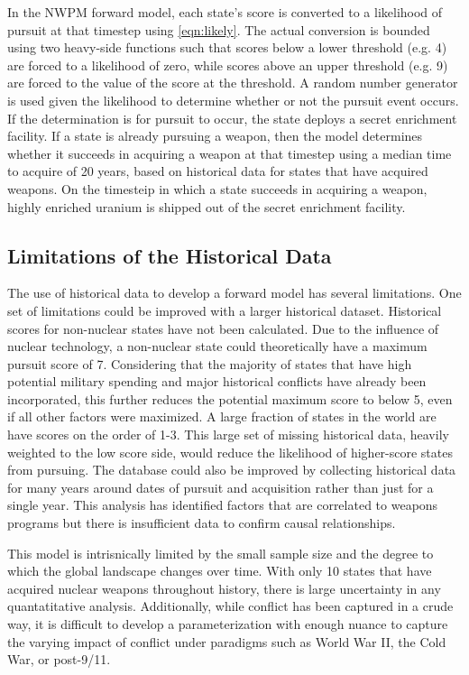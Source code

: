 In the \gls{NWPM} forward model, each state's score is converted to a likelihood of pursuit at that timestep using \ref{eqn:likely}. The actual conversion is bounded using two heavy-side functions such that scores below a lower threshold (e.g. 4) are forced to a likelihood of zero, while scores above an upper threshold (e.g. 9) are forced to the value of the score at the threshold.   A random number generator is used given the likelihood to determine whether or not the pursuit event occurs. If the determination is for pursuit to occur, the state deploys a secret enrichment facility. If a state is already pursuing a weapon, then the model determines whether it succeeds in acquiring a weapon at that timestep using a median time to acquire of 20 years, based on historical data for states that have acquired weapons. On the timesteip in which a state succeeds in acquiring a weapon, highly enriched uranium is shipped out of the secret enrichment facility.

\subsection{Limitations of the Historical Data}
The use of historical data to develop a forward model has several limitations. One set of limitations could be improved with a larger historical dataset.  Historical scores for non-nuclear states have not been calculated. Due to the influence of nuclear technology, a non-nuclear state could theoretically have a maximum pursuit score of 7. Considering that the majority of states that have high potential military spending and major historical conflicts have already been incorporated, this further reduces the potential maximum score to below 5, even if all other factors were maximized.  A large fraction of states in the world are have scores on the order of 1-3.  This large set of missing historical data, heavily weighted to the low score side, would reduce the likelihood of higher-score states from pursuing.  The database could also be improved by collecting historical data for many years around dates of pursuit and acquisition rather than just for a single year. This analysis has identified factors that are correlated to weapons programs but there is insufficient data to confirm causal relationships.   

This model is intrisnically limited by the small sample size and the degree to which the global landscape changes over time. With only 10 states that have acquired nuclear weapons throughout history, there is large uncertainty in any quantatitative analysis. Additionally, while conflict has been captured in a crude way, it is difficult to develop a parameterization with enough nuance to capture the varying impact of conflict under paradigms such as World War II, the Cold War, or post-9/11.

